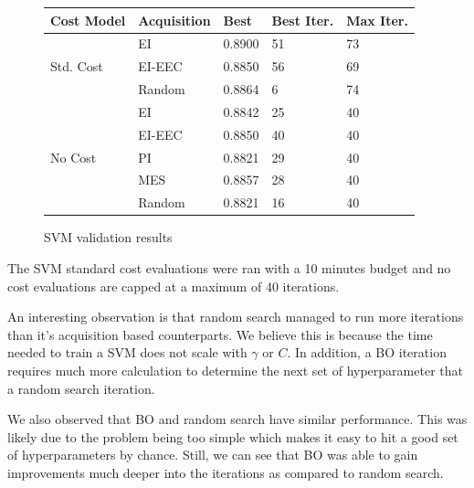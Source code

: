 \documentclass[letterpaper]{article}
\begin{document}
\begin{figure}[h]
\begin{center}
	\begin{tabular}{lllll}
		\hline
		Cost Model & Acquisition & Best & Best Iter. & Max Iter.\\
		\hline
		\multirow{3}{*}{Std. Cost} & EI &  0.8900 & 51 & 73\\
		& EI-EEC & 0.8850 & 56 & 69\\
		& Random & 0.8864 & 6 & 74\\
		\hline
		\multirow{5}{*}{No Cost} & EI & 0.8842 & 25 & 40\\
		& EI-EEC & 0.8850 & 40 & 40\\
		& PI & 0.8821 & 29 & 40\\
		& MES & 0.8857 & 28 & 40\\
		& Random & 0.8821 & 16 & 40\\
		\hline
	\end{tabular}
\end{center}
	\caption{SVM validation results}
\end{figure}
The SVM standard cost evaluations were ran with a 10 minutes budget and no cost evaluations are capped at a maximum of 40 iterations.

An interesting observation is that random search managed to run more iterations than it's acquisition based counterparts.
We believe this is because the time needed to train a SVM does not scale with $\gamma$ or $\textit{C}$.
In addition, a BO iteration requires much more calculation to determine the next set of hyperparameter that a random search iteration.

We also observed that BO and random search have similar performance.
This was likely due to the problem being too simple which makes it easy to hit a good set of hyperparameters by chance.
Still, we can see that BO was able to gain improvements much deeper into the iterations as compared to random search.
\end{document}
